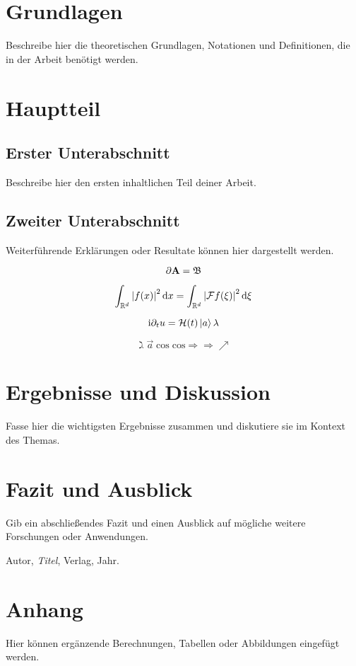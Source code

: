 \documentclass[12pt]{report}
\begin{document}
\section{Grundlagen}
Beschreibe hier die theoretischen Grundlagen, Notationen und Definitionen, die in der Arbeit benötigt werden.

\section{Hauptteil}
\subsection{Erster Unterabschnitt}
Beschreibe hier den ersten inhaltlichen Teil deiner Arbeit.

\subsection{Zweiter Unterabschnitt}
Weiterführende Erklärungen oder Resultate können hier dargestellt werden.

\begin{equation*}
    \partial \mathbf{A} = \mathfrak{B}
\end{equation*}

\medskip

\begin{equation}
    \int_{\mathbb{R}^d} {\left\vert f(x)\right\vert}^2 \, \mathrm{d} x = \int_{\mathbb{R}^d} {\left\vert\mathcal{F} f(\xi)\right\vert}^2 \, \mathrm{d} \xi
\end{equation}

\medskip

\begin{equation}
    \mathrm{i} \partial_t u = \mathcal{H}(t) \Ket{a} \lambda 
\end{equation}

\begin{equation}
    \gimel \overrightarrow{a} \cos \mathrm{cos} \Rightarrow \Longrightarrow \nearrow 
\end{equation}

\section{Ergebnisse und Diskussion}
Fasse hier die wichtigsten Ergebnisse zusammen und diskutiere sie im Kontext des Themas.

\section{Fazit und Ausblick}
Gib ein abschließendes Fazit und einen Ausblick auf mögliche weitere Forschungen oder Anwendungen.

\begin{thebibliography}{99}
     Autor, \emph{Titel}, Verlag, Jahr.
\end{thebibliography}

\appendix
\section{Anhang}
Hier können ergänzende Berechnungen, Tabellen oder Abbildungen eingefügt werden.
\end{document}
